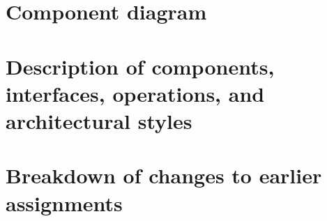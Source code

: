 \section{Component diagram}

\section{Description of components, interfaces, operations, and architectural styles} %

\section{Breakdown of changes to earlier assignments}